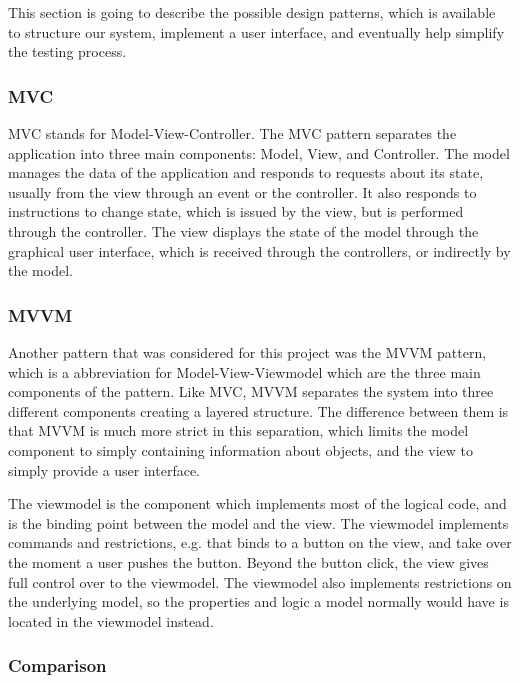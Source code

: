 This section is going to describe the possible design patterns, which is available to structure our system, implement a user interface, and eventually help simplify the testing process.

\subsubsection{MVC}

MVC stands for Model-View-Controller. The MVC pattern separates the application into three main components: Model, View, and Controller. The model manages the data of the application and responds to requests about its state, usually from the view through an event or the controller.  It also responds to instructions to change state, which is issued by the view, but is performed through the controller. The view displays the state of the model through the graphical user interface, which is received through the controllers, or indirectly by the model. \cite{Pattern1}

\subsubsection{MVVM}

Another pattern that was considered for this project was the MVVM pattern, which is a abbreviation for Model-View-Viewmodel which are the three main components of the pattern. Like MVC, MVVM separates the system into three different components creating a layered structure. The difference between them is that MVVM is much more strict in this separation, which limits the model component to simply containing information about objects, and the view to simply provide a user interface. \cite{Pattern2}

The viewmodel is the component which implements most of the logical code, and is the binding point between the model and the view. The viewmodel implements commands and restrictions, e.g. that binds to a button on the view, and take over the moment a user pushes the button. Beyond the button click, the view gives full control over to the viewmodel. The viewmodel also implements restrictions on the underlying model, so the properties and logic a model normally would have is located in the viewmodel instead. \cite{Pattern2}

\subsubsection{Comparison}

